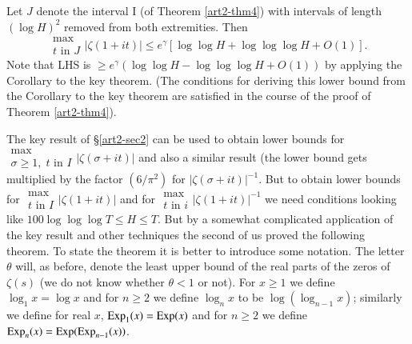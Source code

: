 \begin{theorem}\label{art2-thm5}
Let $J$ denote the interval I (of Theorem \ref{art2-thm4})  with intervals of length $(\log H)^2$ removed from both extremities. Then 
$$
\begin{matrix}
\max\\
t \text{ in } J 
\end{matrix} |\zeta (1+ it)| \leqslant e^\gamma [\log \log H + \log \log \log H+ O(1)].
$$
Note that {\rm LHS} is $\geqslant e^\gamma (\log \log H-\log \log \log H+ O(1))$ by applying the Corollary to the key theorem. (The conditions for deriving this lower bound from the Corollary to the key theorem are satisfied in the course of the proof of Theorem \ref{art2-thm4}).
\end{theorem}

The key result of \S \ref{art2-sec2} can be used to obtain lower bounds for\break $\begin{matrix}
\max\\\sigma \geqslant 1, \; t \text{ in } I  
\end{matrix} |\zeta (\sigma + it)| $ and also a similar result (the lower bound gets multiplied by the factor $(6/\pi^2)$ for $|\zeta(\sigma + it)|^{-1}$. But to obtain lower bounds for $\begin{matrix}
\max\\
t \text{ in } I
\end{matrix} |\zeta(1+ it)|$ and for 
$\begin{matrix}
\max\\
t \text{ in } i 
\end{matrix} |\zeta(1+ it)|^{-1}$ we need conditions looking like $100 \log \log \log T \leqslant H \leqslant T$. But by a somewhat complicated application of the key result and other techniques the second of us \cite{art2-key13} proved the following theorem. To state the theorem it is better to introduce some notation. The letter $\theta$ will, as before, denote the least upper bound of the real parts of the zeros of $\zeta(s)$ (we do not know whether $\theta <1$ or not). For $x \geqslant 1$ we define $\log_1 x = \log x$ and for $n \geqslant 2$ we define $\log_n x$ to be $\log(\log_{n-1}x)$; similarly we define for real $x$, $\operatorname{Exp}_1(x) = \operatorname{Exp} (x)$  and for $n\geqslant 2$ we define $\operatorname{Exp}_n(x) = \operatorname{Exp} (\operatorname{Exp}_{n-1} (x))$.

